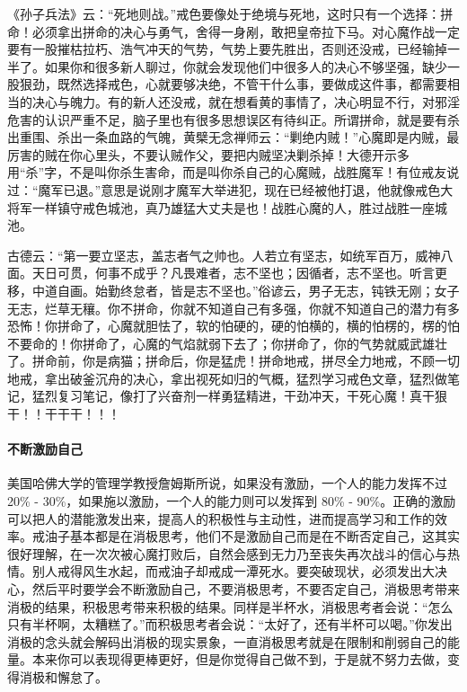 《孙子兵法》云：“死地则战。”戒色要像处于绝境与死地，这时只有一个选择：拼命！必须拿出拼命的决心与勇气，舍得一身剐，敢把皇帝拉下马。对心魔作战一定要有一股摧枯拉朽、浩气冲天的气势，气势上要先胜出，否则还没戒，已经输掉一半了。如果你和很多新人聊过，你就会发现他们中很多人的决心不够坚强，缺少一股狠劲，既然选择戒色，心就要够决绝，不管干什么事，要做成这件事，都需要相当的决心与魄力。有的新人还没戒，就在想看黄的事情了，决心明显不行，对邪淫危害的认识严重不足，脑子里也有很多思想误区有待纠正。所谓拼命，就是要有杀出重围、杀出一条血路的气魄，黄檗无念禅师云：“剿绝内贼！”心魔即是内贼，最厉害的贼在你心里头，不要认贼作父，要把内贼坚决剿杀掉！大德开示多用“杀”字，不是叫你杀生害命，而是叫你杀自己的心魔贼，战胜魔军！有位戒友说过：“魔军已退。”意思是说刚才魔军大举进犯，现在已经被他打退，他就像戒色大将军一样镇守戒色城池，真乃雄猛大丈夫是也！战胜心魔的人，胜过战胜一座城池。

古德云：“第一要立坚志，盖志者气之帅也。人若立有坚志，如统军百万，威神八面。天日可贯，何事不成乎？凡畏难者，志不坚也；因循者，志不坚也。听言更移，中道自画。始勤终怠者，皆是志不坚也。”俗谚云，男子无志，钝铁无刚；女子无志，烂草无穰。你不拼命，你就不知道自己有多强，你就不知道自己的潜力有多恐怖！你拼命了，心魔就胆怯了，软的怕硬的，硬的怕横的，横的怕楞的，楞的怕不要命的！你拼命了，心魔的气焰就弱下去了；你拼命了，你的气势就威武雄壮了。拼命前，你是病猫；拼命后，你是猛虎！拼命地戒，拼尽全力地戒，不顾一切地戒，拿出破釜沉舟的决心，拿出视死如归的气概，猛烈学习戒色文章，猛烈做笔记，猛烈复习笔记，像打了兴奋剂一样勇猛精进，干劲冲天，干死心魔！真干狠干！！干干干！！！

\paragraph{不断激励自己}

美国哈佛大学的管理学教授詹姆斯所说，如果没有激励，一个人的能力发挥不过 20\% - 30\%，如果施以激励，一个人的能力则可以发挥到 80\% - 90\%。正确的激励可以把人的潜能激发出来，提高人的积极性与主动性，进而提高学习和工作的效率。戒油子基本都是在消极思考，他们不是激励自己而是在不断否定自己，这其实很好理解，在一次次被心魔打败后，自然会感到无力乃至丧失再次战斗的信心与热情。别人戒得风生水起，而戒油子却戒成一潭死水。要突破现状，必须发出大决心，然后平时要学会不断激励自己，不要消极思考，不要否定自己，消极思考带来消极的结果，积极思考带来积极的结果。同样是半杯水，消极思考者会说：“怎么只有半杯啊，太糟糕了。”而积极思考者会说：“太好了，还有半杯可以喝。”你发出消极的念头就会解码出消极的现实景象，一直消极思考就是在限制和削弱自己的能量。本来你可以表现得更棒更好，但是你觉得自己做不到，于是就不努力去做，变得消极和懈怠了。

